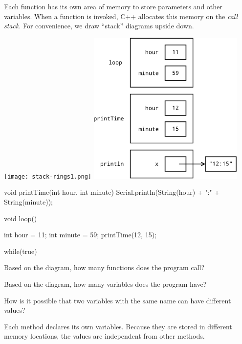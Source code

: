 
Each function has its own area of memory to store parameters and other variables.
When a function is invoked, C++ allocates this memory on the \emph{call stack}.
For convenience, we draw ``stack'' diagrams upside down.

\begin{center}
\texttt{[image: stack-rings1.png]}
\hspace{1em}
\includegraphics[height=3in]{stack1_loop-crop.pdf}
\end{center}


\begin{javalst}
void printTime(int hour, int minute) {
    Serial.println(String(hour) + ":" + String(minute));
}

void loop() {
    int hour = 11;
    int minute = 59;
    printTime(12, 15);

    while(true) {
    }
}
\end{javalst}



\Q Based on the diagram, how many functions does the program call? 
\vspace{1ex}


\Q Based on the diagram, how many variables does the program have? 
\vspace{1ex}


\Q How is it possible that two variables with the same name can have different values?

\begin{answer}
Each method declares its own variables.
Because they are stored in different memory locations, the values are independent from other methods.
\end{answer}

